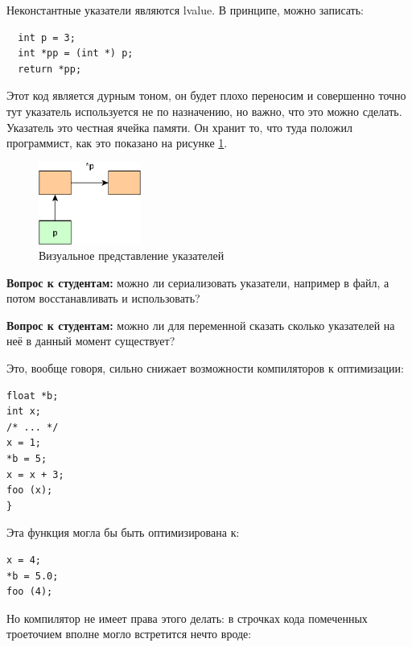 \documentclass[a4paper,12pt,oneside]{article}
\newif\ifanswers
\begin{document}
Неконстантные указатели являются lvalue. В принципе, можно записать:

\begin{lstlisting}
  int p = 3;
  int *pp = (int *) p;
  return *pp;
\end{lstlisting}

Этот код является дурным тоном, он будет плохо переносим и совершенно точно тут указатель используется не по назначению, но важно, что это можно сделать. Указатель это честная ячейка памяти. Он хранит то, что туда положил программист, как это показано на рисунке \ref{fig:pointers}.

\begin{figure}[h!]
\centering
\includegraphics[width=0.3\textwidth]{illustrations/pointers-crop.pdf}
\caption{Визуальное представление указателей}
\label{fig:pointers}
\end{figure}

\textbf{Вопрос к студентам:} можно ли сериализовать указатели, например в файл, а потом восстанавливать и использовать?

\ifanswers
Ответ: да, в течении срока жизни того, на что они указывают.
\fi

\textbf{Вопрос к студентам:} можно ли для переменной сказать сколько указателей на неё в данный момент существует?

\ifanswers
Ответ: увы, нет. Никакая переменная не ``знает'' о том, что кто-то взял её адрес и т.п.
\fi

Это, вообще говоря, сильно снижает возможности компиляторов к оптимизации:

\begin{lstlisting}
float *b; 
int x;
/* ... */
x = 1;
*b = 5;
x = x + 3;
foo (x);
}
\end{lstlisting}

Эта функция могла бы быть оптимизирована к:

\begin{lstlisting}
x = 4;
*b = 5.0;
foo (4);
\end{lstlisting}

Но компилятор не имеет права этого делать: в строчках кода помеченных троеточием вполне могло встретится нечто вроде:
\end{document}
